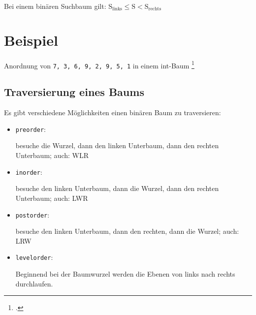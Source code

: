 \documentclass{lehramt-informatik-haupt}
\begin{document}
Bei einem binären Suchbaum gilt:
$\text{S}_\text{links} \leq \text{S} < \text{S}_\text{rechts}$

\section{Beispiel}

Anordnung von \verb|7, 3, 6, 9, 2, 9, 5, 1| in einem int-Baum
\footcite[Seite 5]{aud:fs:5}

\begin{center}
\end{center}

%

\subsection{Traversierung eines Baums}

Es gibt verschiedene Möglichkeiten einen binären Baum zu
traversieren:

\begin{itemize}
\item \texttt{preorder}:

besuche die Wurzel, dann den linken Unterbaum, dann den rechten
Unterbaum; auch: WLR


\item \texttt{inorder}:

besuche den linken Unterbaum, dann die Wurzel, dann den rechten
Unterbaum;
auch: LWR


\item \texttt{postorder}:

besuche den linken Unterbaum, dann den rechten, dann die Wurzel;
auch: LRW


\item \texttt{levelorder}:

Beginnend bei der Baumwurzel werden die
Ebenen von links nach rechts durchlaufen.


\end{itemize}
\end{document}

